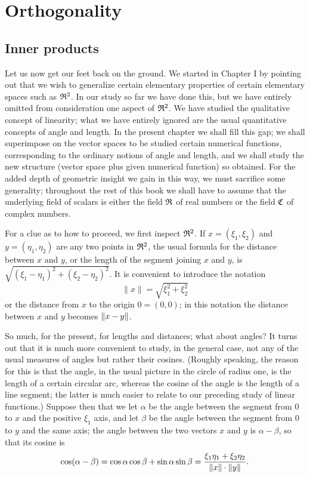 \chapter{Orthogonality}

\section{Inner products}

Let us now get our feet back on the ground. We started in Chapter I by pointing
out that we wish to generalize certain elementary properties of certain
elementary spaces such as \(\mathfrak{R}^2\). In our study so far we have done this,
but we have entirely omitted from consideration one aspect of \(\mathfrak{R}^2\). We
have studied the qualitative concept of linearity; what we have entirely ignored
are the usual quantitative concepts of angle and length. In the present chapter
we shall fill this gap; we shall superimpose on the vector spaces to be studied
certain numerical functions, corresponding to the ordinary notions of angle and
length, and we shall study the new structure (vector space plus given numerical
function) so obtained. For the added depth of geometric insight we gain in this
way, we must sacrifice some generality; throughout the rest of this book we
shall have to assume that the underlying field of scalars is either the field
\(\mathfrak{R}\) of real numbers or the field \(\mathfrak{C}\) of complex numbers.

For a clue as to how to proceed, we first inspect \(\mathfrak{R}^2\). If \(x = (\xi_1,
\xi_2)\) and \(y= (\eta_1, \eta_2)\) are any two points in \(\mathfrak{R}^2\), the
usual formula for the distance between \(x\) and \(y\), or the length of the
segment joining \(x\) and \(y\), is \(\sqrt{(\xi_1 - \eta_1)^2 + (\xi_2 -
\eta_2)^2}\). It is convenient to introduce the notation
\begin{equation*}
    \|x\| = \sqrt{\xi_1^2 + \xi_2^2}
\end{equation*}
or the distance from \(x\) to the origin \(0 = (0, 0)\); in this notation the
distance between \(x\) and \(y\) becomes \(\left\lVert x-y\right\rVert\).

So much, for the present, for lengths and distances; what about angles? It turns
out that it is much more convenient to study, in the general case, not any of
the usual measures of angles but rather their cosines. (Roughly speaking, the
reason for this is that the angle, in the usual picture in the circle of radius
one, is the length of a certain circular arc, whereas the cosine of the angle is
the length of a line segment; the latter is much easier to relate to our
preceding study of linear functions.) Suppose then that we let \(\alpha\) be the
angle between the segment from \(0\) to \(x\) and the positive \(\xi_1\) axis,
and let \(\beta\) be the angle between the segment from \(0\) to \(y\) and the
same axis; the angle between the two vectors \(x\) and \(y\) is \(\alpha -
\beta\), so that its cosine is
\begin{equation*}
    \cos(\alpha - \beta) = \cos\alpha\cos\beta + \sin\alpha\sin\beta
    = \frac{\xi_1\eta_1 + \xi_2\eta_2}{\left\lVert x\right\rVert\cdot\left\lVert y\right\rVert}.
\end{equation*}

